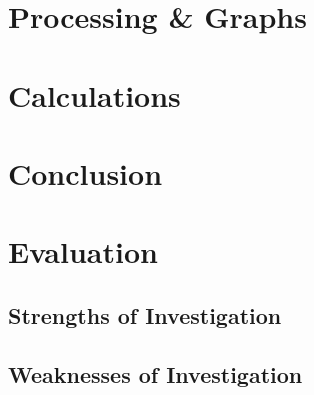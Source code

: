 \documentclass[11pt]{article}
\begin{document}
    \section{Processing \& Graphs}
    
    \section{Calculations}
    
    \section{Conclusion}
    
    \section{Evaluation}
        \subsection{Strengths of Investigation}
        
        \subsection{Weaknesses of Investigation}
        
    
    
\end{document}
